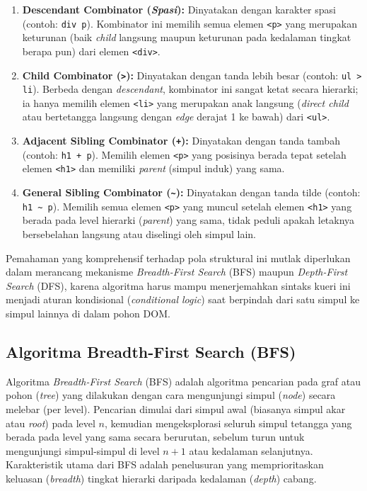 \documentclass[12pt]{article}
\begin{document}
\begin{enumerate}
    \item \textbf{Descendant Combinator (\textit{Spasi}):} Dinyatakan dengan karakter spasi (contoh: \verb|div p|). Kombinator ini memilih semua elemen \verb|<p>| yang merupakan keturunan (baik \textit{child} langsung maupun keturunan pada kedalaman tingkat berapa pun) dari elemen \verb|<div>|.
    
    \item \textbf{Child Combinator (\verb|>|):} Dinyatakan dengan tanda lebih besar (contoh: \verb|ul > li|). Berbeda dengan \textit{descendant}, kombinator ini sangat ketat secara hierarki; ia hanya memilih elemen \verb|<li>| yang merupakan anak langsung (\textit{direct child} atau bertetangga langsung dengan \textit{edge} derajat 1 ke bawah) dari \verb|<ul>|.
    
    \item \textbf{Adjacent Sibling Combinator (\verb|+|):} Dinyatakan dengan tanda tambah (contoh: \verb|h1 + p|). Memilih elemen \verb|<p>| yang posisinya berada tepat setelah elemen \verb|<h1>| dan memiliki \textit{parent} (simpul induk) yang sama.
    
    \item \textbf{General Sibling Combinator (\verb|~|):} Dinyatakan dengan tanda tilde (contoh: \verb|h1 ~ p|). Memilih semua elemen \verb|<p>| yang muncul setelah elemen \verb|<h1>| yang berada pada level hierarki (\textit{parent}) yang sama, tidak peduli apakah letaknya bersebelahan langsung atau diselingi oleh simpul lain.
\end{enumerate}

Pemahaman yang komprehensif terhadap pola struktural ini mutlak diperlukan dalam merancang mekanisme \textit{Breadth-First Search} (BFS) maupun \textit{Depth-First Search} (DFS), karena algoritma harus mampu menerjemahkan sintaks kueri ini menjadi aturan kondisional (\textit{conditional logic}) saat berpindah dari satu simpul ke simpul lainnya di dalam pohon DOM.

\subsection{Algoritma Breadth-First Search (BFS)}

Algoritma \textit{Breadth-First Search} (BFS) adalah algoritma pencarian pada graf atau pohon (\textit{tree}) yang dilakukan dengan cara mengunjungi simpul (\textit{node}) secara melebar (per level). Pencarian dimulai dari simpul awal (biasanya simpul akar atau \textit{root}) pada level $n$, kemudian mengeksplorasi seluruh simpul tetangga yang berada pada level yang sama secara berurutan, sebelum turun untuk mengunjungi simpul-simpul di level $n+1$ atau kedalaman selanjutnya. Karakteristik utama dari BFS adalah penelusuran yang memprioritaskan keluasan (\textit{breadth}) tingkat hierarki daripada kedalaman (\textit{depth}) cabang.
\end{document}
